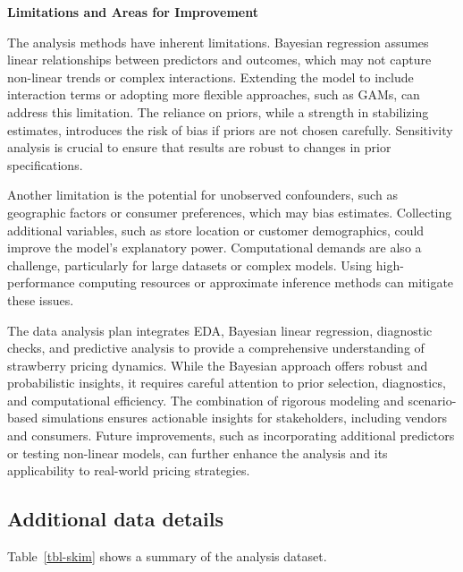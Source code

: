 \documentclass[
  letterpaper,
  DIV=11,
  numbers=noendperiod]{scrartcl}
\begin{document}
\textbf{Limitations and Areas for Improvement}

The analysis methods have inherent limitations. Bayesian regression
assumes linear relationships between predictors and outcomes, which may
not capture non-linear trends or complex interactions. Extending the
model to include interaction terms or adopting more flexible approaches,
such as GAMs, can address this limitation. The reliance on priors, while
a strength in stabilizing estimates, introduces the risk of bias if
priors are not chosen carefully. Sensitivity analysis is crucial to
ensure that results are robust to changes in prior specifications.

Another limitation is the potential for unobserved confounders, such as
geographic factors or consumer preferences, which may bias estimates.
Collecting additional variables, such as store location or customer
demographics, could improve the model's explanatory power. Computational
demands are also a challenge, particularly for large datasets or complex
models. Using high-performance computing resources or approximate
inference methods can mitigate these issues.

The data analysis plan integrates EDA, Bayesian linear regression,
diagnostic checks, and predictive analysis to provide a comprehensive
understanding of strawberry pricing dynamics. While the Bayesian
approach offers robust and probabilistic insights, it requires careful
attention to prior selection, diagnostics, and computational efficiency.
The combination of rigorous modeling and scenario-based simulations
ensures actionable insights for stakeholders, including vendors and
consumers. Future improvements, such as incorporating additional
predictors or testing non-linear models, can further enhance the
analysis and its applicability to real-world pricing strategies.

\subsection{Additional data details}\label{additional-data-details}

Table~\ref{tbl-skim} shows a summary of the analysis dataset.
\end{document}
